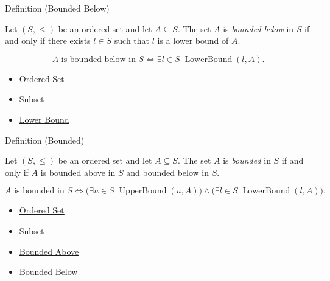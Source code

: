 \begin{definitionbox}{Definition (Bounded Below)}
\begin{definition}
\label{def:bounded-below}
Let $(S,\le)$ be an ordered set and let $A\subseteq S$. The set $A$ is \emph{bounded below} in $S$ if and only if there exists $l\in S$ such that $l$ is a lower bound of $A$.
\end{definition}
\end{definitionbox}

\begin{remark*}
\[
A\text{ is bounded below in }S
\Longleftrightarrow
\exists l\in S\;\operatorname{LowerBound}(l,A).
\]
\end{remark*}

\begin{dependencies}
\begin{itemize}
  \item \hyperref[def:ordered-set]{Ordered Set}
  \item \hyperref[def:subset]{Subset}
  \item \hyperref[def:lower-bound]{Lower Bound}
\end{itemize}
\end{dependencies}

\begin{definitionbox}{Definition (Bounded)}
\begin{definition}[Bounded]
\label{def:bounded}
Let $(S,\le)$ be an ordered set and let $A\subseteq S$. The set $A$ is \emph{bounded} in $S$ if and only if $A$ is bounded above in $S$ and bounded below in $S$.
\end{definition}
\end{definitionbox}

\begin{remark*}
\[
A\text{ is bounded in }S
\Longleftrightarrow
\bigl(\exists u\in S\;\operatorname{UpperBound}(u,A)\bigr)
\land
\bigl(\exists l\in S\;\operatorname{LowerBound}(l,A)\bigr).
\]
\end{remark*}

\begin{dependencies}
\begin{itemize}
  \item \hyperref[def:ordered-set]{Ordered Set}
  \item \hyperref[def:subset]{Subset}
  \item \hyperref[def:bounded-above]{Bounded Above}
  \item \hyperref[def:bounded-below]{Bounded Below}
\end{itemize}
\end{dependencies}

